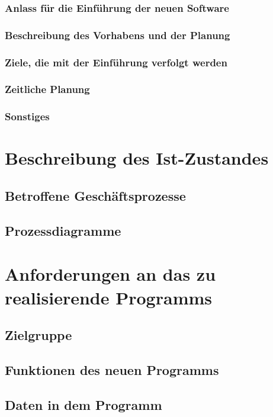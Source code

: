 \documentclass[10pt,a4paper]{article}
\begin{document}
\subsubsection*{Anlass für die Einführung der neuen Software}

\subsubsection*{Beschreibung des Vorhabens und der Planung}

\subsubsection*{Ziele, die mit der Einführung verfolgt werden}

\subsubsection*{Zeitliche Planung}

\subsubsection*{Sonstiges}
\newpage 
\section{Beschreibung des Ist-Zustandes}
\subsection{Betroffene Geschäftsprozesse}
\subsection{Prozessdiagramme}
\newpage 
\section{Anforderungen an das zu realisierende Programms}
\subsection{Zielgruppe}
\subsection{Funktionen des neuen Programms}
\subsection{Daten in dem Programm}
\end{document}
